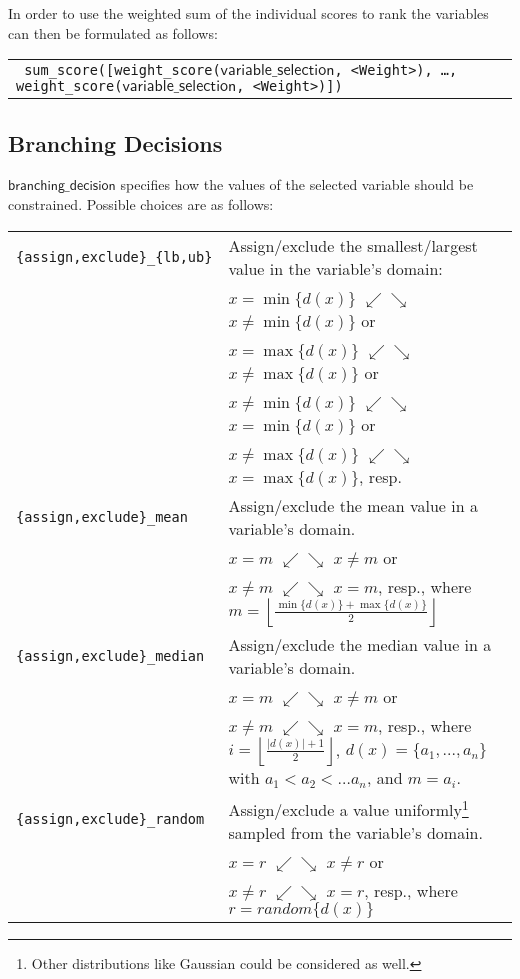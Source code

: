 \documentclass[a4paper]{article}
\newcommand{\fz}[1]{\texttt{#1}}
\newcommand{\fzsf}[1]{\ensuremath{\mathsf{#1}}}
\newcommand{\fzvarchoiceannotation}{\fzsf{variable\_selection}}
\newcommand{\fznassignmentannotation}{\fzsf{branching\_decision}}
\begin{document}
In order to use the weighted sum of the individual scores to rank the variables can then be formulated as follows:

\begin{tabular}{l}
\fz{
sum\_score([weight\_score(\fzvarchoiceannotation, <Weight>), \ldots, weight\_score(\fzvarchoiceannotation, <Weight>)])
}
\end{tabular}


\subsection{Branching Decisions}
\label{sec:valueselect}
\fznassignmentannotation{} specifies how the values of the selected variable
should be constrained.  Possible choices are as follows:

\begin{tabular}{p{.35\linewidth}p{.6\linewidth}}
\fz{\{assign,exclude\}\_\{lb,ub\}}
& Assign/exclude the smallest/largest value in the variable's domain:\\
& $x = \min\{d(x)\}$ $\swarrow\searrow$ $x \neq \min\{d(x)\}$ or\\
& $x = \max\{d(x)\}$ $\swarrow\searrow$ $x \neq \max\{d(x)\}$ or\\
& $x \neq \min\{d(x)\}$ $\swarrow\searrow$ $x = \min\{d(x)\}$ or\\
& $x \neq \max\{d(x)\}$ $\swarrow\searrow$ $x = \max\{d(x)\}$, resp.\\

\fz{\{assign,exclude\}\_mean}
& Assign/exclude the mean value in a variable's domain.\\
& $x=m$  $\swarrow\searrow$ $x \neq m$ or \\
& $x\neq m$  $\swarrow\searrow$ $x=m$, resp., 
where $m=\left\lfloor\frac{\min\{d(x)\} + \max\{d(x)\}}{2}\right\rfloor$ \\


\fz{\{assign,exclude\}\_median}
& Assign/exclude the median value in a variable's domain.\\
& $x=m$  $\swarrow\searrow$ $x \neq m$ or \\
& $x\neq m$  $\swarrow\searrow$ $x=m$, resp., 
where $i=\left\lfloor\frac{|d(x)| + 1}{2}\right\rfloor$, \mbox{$d(x)=\{a_1,...,a_n\}$} with $a_1 < a_2 < \ldots a_n$, and $m=a_i$.\\

\fz{\{assign,exclude\}\_random}
& Assign/exclude a value uniformly\footnote{Other distributions like Gaussian could be considered as well.} sampled from the variable's domain.\\
& $x=r$ $\swarrow\searrow$ $x \neq r$ or\\
& $x \neq r$ $\swarrow\searrow$ $x = r$, resp., where $r=random\{d(x)\}$\\


\end{tabular}
\end{document}
